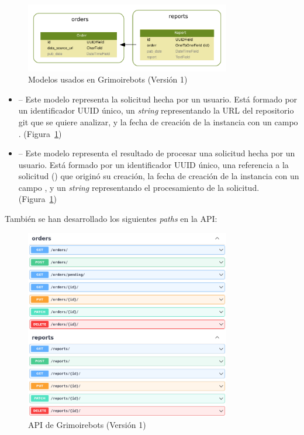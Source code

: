 \begin{figure}[ht]
    \centering
    \includegraphics[width=0.8\textwidth]{Figures/grimoirebots_i_models}
    \decoRule
    \caption[Grimoirebots I (modelos)]{Modelos usados en Grimoirebots (Versión 1)}
    \label{fig:grimoirebots_i_models}
\end{figure}

\begin{itemize}
    \item {} -- Este modelo representa la solicitud hecha por un usuario. Está formado por un identificador UUID único, un \emph{string} representando la URL del repositorio git que se quiere analizar, y la fecha de creación de la instancia con un campo . (Figura~\ref{fig:grimoirebots_i_models})
    \item {} -- Este modelo representa el resultado de procesar una solicitud hecha por un usuario. Está formado por un identificador UUID único, una referencia a la solicitud () que originó su creación, la fecha de creación de la instancia con un campo , y un \emph{string} representando el procesamiento de la solicitud. (Figura~\ref{fig:grimoirebots_i_models})
\end{itemize}

También se han desarrollado los siguientes \emph{paths} en la API:

\begin{figure}[ht]
    \centering
    \includegraphics[width=0.8\textwidth]{Figures/grimoirebots_i_api}
    \decoRule
    \caption[Grimoirebots I (API)]{API de Grimoirebots (Versión 1)}
    \label{fig:grimoirebots_i_api}
\end{figure}


